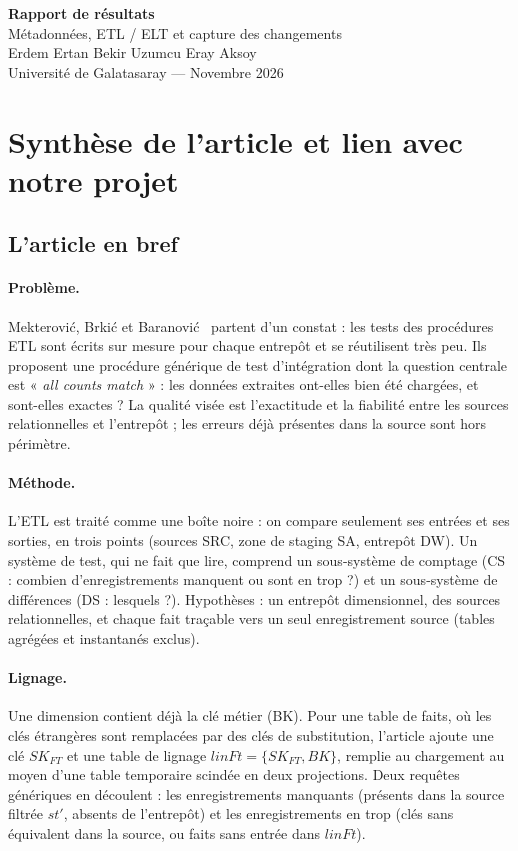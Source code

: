 \documentclass[9pt,a4paper]{article}
\begin{document}
\begin{center}
  {\LARGE\bfseries Rapport de résultats}\\[2pt]
  {\large Métadonnées, ETL / ELT et capture des changements}\\[3pt]
  Erdem Ertan \textperiodcentered{} Bekir Uzumcu \textperiodcentered{} Eray Aksoy\\
  Université de Galatasaray --- Novembre 2026
\end{center}

\section{Synthèse de l'article et lien avec notre projet}

\subsection{L'article en bref}

\paragraph{Problème.} Mekterovi\'c, Brki\'c et Baranovi\'c~\cite{mekterovic2011} partent d'un constat : les tests des procédures ETL sont écrits sur mesure pour chaque entrepôt et se réutilisent très peu. Ils proposent une procédure générique de test d'intégration dont la question centrale est « \emph{all counts match} » : les données extraites ont-elles bien été chargées, et sont-elles exactes ? La qualité visée est l'exactitude et la fiabilité entre les sources relationnelles et l'entrepôt ; les erreurs déjà présentes dans la source sont hors périmètre.

\paragraph{Méthode.} L'ETL est traité comme une boîte noire : on compare seulement ses entrées et ses sorties, en trois points (sources SRC, zone de staging SA, entrepôt DW). Un système de test, qui ne fait que lire, comprend un sous-système de comptage (CS : combien d'enregistrements manquent ou sont en trop ?) et un sous-système de différences (DS : lesquels ?). Hypothèses : un entrepôt dimensionnel, des sources relationnelles, et chaque fait traçable vers un seul enregistrement source (tables agrégées et instantanés exclus).

\paragraph{Lignage.} Une dimension contient déjà la clé métier (BK). Pour une table de faits, où les clés étrangères sont remplacées par des clés de substitution, l'article ajoute une clé $SK_{FT}$ et une table de lignage $linFt=\{SK_{FT},BK\}$, remplie au chargement au moyen d'une table temporaire scindée en deux projections. Deux requêtes génériques en découlent : les enregistrements manquants (présents dans la source filtrée $st'$, absents de l'entrepôt) et les enregistrements en trop (clés sans équivalent dans la source, ou faits sans entrée dans $linFt$).
\end{document}
